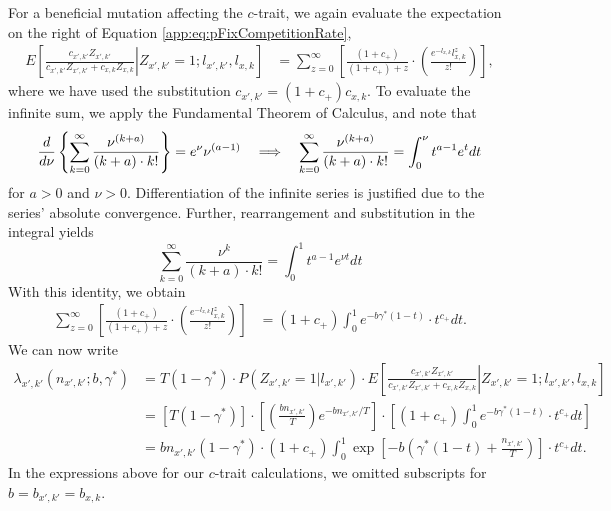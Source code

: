 \documentclass[9pt,twocolumn,twoside,lineno]{gsajnl}
\begin{document}
For a beneficial mutation affecting the $c$-trait, we again evaluate the expectation on the right of Equation \eqref{app:eq:pFixCompetitionRate},
\begin{align*}
E \left[ \left.  \frac{c_{x',k'}Z_{x',k'}}{c_{x',k'}Z_{x',k'}+c_{x,k}Z_{x,k}} \right| Z_{x',k'}=1;l_{x',k'},l_{x,k}\right] &=\sum_{z=0}^\infty \left [ \frac{(1+c_+)}{(1+c_+)+z} \cdot \left(\frac{e^{-l_{x,k}}l_{x,k}^z}{z!}\right) \right ],
\end{align*}
where we have used the substitution $c_{x',k'}=(1+c_+)c_{x,k}$. To evaluate the infinite sum, we apply the Fundamental Theorem of Calculus, and note that 
\[
\frac{d}{d\nu} \left \{ \sum_{k=0}^\infty \frac{\nu^{(k+a)}}{(k+a)\cdot k!} \right \} = e^\nu \nu^{(a-1)}  \hspace{.1in} \implies \hspace{.1in}
\sum_{k=0}^\infty \frac{\nu^{(k+a)}}{(k+a)\cdot k!} = \int_{0}^\nu t^{a-1} e^{t} dt
\]
for $a>0$ and $\nu > 0$. Differentiation of the infinite series is justified due to the series' absolute convergence. Further, rearrangement and substitution in the integral yields 
\[
\sum_{k=0}^\infty \frac{\nu^{k}}{(k+a)\cdot k!} = \int_{0}^1 t^{a-1} e^{\nu t} dt
\]
With this identity, we obtain
\begin{align*}
\sum_{z=0}^\infty \left [ \frac{(1+c_+)}{(1+c_+)+z} \cdot \left(\frac{e^{-l_{x,k}}l_{x,k}^z}{z!}\right) \right ] &= (1+c_+) \int_0^1 e^{-b\gamma^*(1-t)} \cdot t^{c_+} dt.
\end{align*}
We can now write
\begin{align}
\lambda_{x',k'}(n_{x',k'};b,\gamma^*) &= T(1-\gamma^*)\cdot P(Z_{x',k'} = 1|l_{x',k'})\cdot  E \left[ \left.  \frac{c_{x',k'}Z_{x',k'}}{c_{x',k'}Z_{x',k'}+c_{x,k}Z_{x,k}} \right| Z_{x',k'}=1;l_{x',k'},l_{x,k}\right] \nonumber\\[7pt]
&= \left[T(1-\gamma^*)\right]\cdot\left[\left(\frac{b n_{x',k'}}{T}\right)e^{-b n_{x',k'}/T}\right]\cdot \left [ (1+c_+) \int_0^1 e^{-b\gamma^*(1-t)} \cdot t^{c_+} dt \right ] \nonumber\\[7pt]
 &= b n_{x',k'}(1-\gamma^*) \cdot (1+c_+) \int_0^1 \exp\left [ -b\left(\gamma^*(1-t)+\frac{n_{x',k'}}{T}\right) \right] \cdot t^{c_+} dt. \label{app:eq:cCompRate}
\end{align} 
In the expressions above for our $c$-trait calculations, we omitted subscripts for $b = b_{x',k'} = b_{x,k}$.
\end{document}
